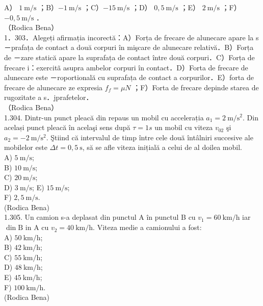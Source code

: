 \documentclass[10pt]{article}
\begin{document}
A） $1 \mathrm{~m} / \mathrm{s}$ ；B）$-1 \mathrm{~m} / \mathrm{s}$ ；C）$-15 \mathrm{~m} / \mathrm{s}$ ；D） $0,5 \mathrm{~m} / \mathrm{s}$ ；E） $2 \mathrm{~m} / \mathrm{s}$ ；F）$-0,5 \mathrm{~m} / \mathrm{s}$ ．\\
（Rodica Bena）\\
1．303．Alegeți afirmația incorectă：A）Forța de frecare de alunecare apare la s－prafața de contact a două corpuri în mişcare de alunecare relativă．B）Forța de －zare statică apare la suprafața de contact între două corpuri．C）Forța de frecare i：exercitã asupra ambelor corpuri în contact．D）Forta de frecare de alunecare este －roportională cu suprafața de contact a corpurilor．E）forta de frecare de alunecare ze expresia $f_{f}=\mu N$ ；F）Forta de frecare depinde starea de rugozitate a s．jprafetelor．\\
（Rodica Bena）\\
1.304. Dintr-un punct pleacă din repaus un mobil cu accelerația $a_{1}=2 \mathrm{~m} / \mathrm{s}^{2}$. Din același punct pleacă în acelaşi sens după $\tau=1 s$ un mobil cu viteza $v_{02}$ şi $a_{2}=-2 \mathrm{~m} / \mathrm{s}^{2}$. Ştiind că intervalul de timp între cele două întâlniri succesive ale mobilelor este $\Delta t=0,5 \mathrm{~s}$, să se afle viteza inițială a celui de al doilea mobil.\\
A) $5 \mathrm{~m} / \mathrm{s}$;\\
B) $10 \mathrm{~m} / \mathrm{s}$;\\
C) $20 \mathrm{~m} / \mathrm{s}$;\\
D) $3 \mathrm{~m} / \mathrm{s}$; E) $15 \mathrm{~m} / \mathrm{s}$;\\
F) $2,5 \mathrm{~m} / \mathrm{s}$.\\
(Rodica Bena)\\
1.305. Un camion s-a deplasat din punctul A în punctul B cu $v_{1}=60 \mathrm{~km} / \mathrm{h}$ iar $\operatorname{din} \mathrm{B}$ in A cu $v_{2}=40 \mathrm{~km} / \mathrm{h}$. Viteza medie a camionului a fost:\\
A) $50 \mathrm{~km} / \mathrm{h}$;\\
B) $42 \mathrm{~km} / \mathrm{h}$;\\
C) $55 \mathrm{~km} / \mathrm{h}$;\\
D) $48 \mathrm{~km} / \mathrm{h}$;\\
E) $45 \mathrm{~km} / \mathrm{h}$;\\
F) $100 \mathrm{~km} / \mathrm{h}$.\\
(Rodica Bena)\\
\end{document}
